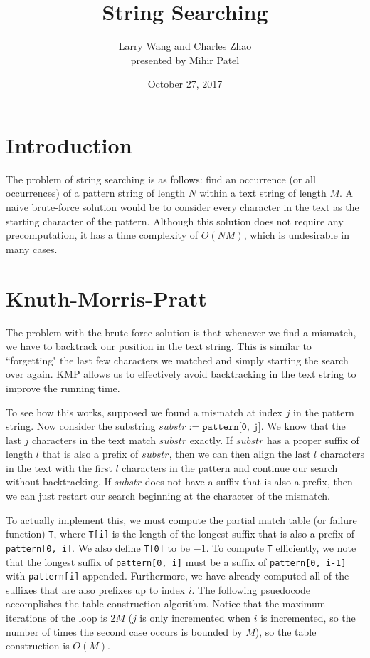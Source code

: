 \documentclass[11pt]{article}
\title{String Searching}
\author{Larry Wang and Charles Zhao \\
    \normalsize presented by Mihir Patel}
\date{October 27, 2017}
\begin{document}
\maketitle

\section{Introduction}
The problem of string searching is as follows: find an occurrence (or all occurrences) of a pattern string of length $N$ within a text string of length $M$. A naive brute-force solution would be to consider every character in the text as the starting character of the pattern. Although this solution does not require any precomputation, it has a time complexity of $O(NM)$, which is undesirable in many cases. 


\section{Knuth-Morris-Pratt}
The problem with the brute-force solution is that whenever we find a mismatch, we have to backtrack our position in the text string. This is similar to ``forgetting" the last few characters we matched and simply starting the search over again. KMP allows us to effectively avoid backtracking in the text string to improve the running time. 

To see how this works, supposed we found a mismatch at index $j$ in the pattern string. Now consider the substring $substr := \texttt{pattern[0, j]}$. We know that the last $j$ characters in the text match $substr$ exactly. If $substr$ has a proper suffix of length $l$ that is also a prefix of $substr$, then we can then align the last $l$ characters in the text with the first $l$ characters in the pattern and continue our search without backtracking. If $substr$ does not have a suffix that is also a prefix, then we can just restart our search beginning at the character of the mismatch. 

To actually implement this, we must compute the partial match table (or failure function) \texttt{T}, where \texttt{T[i]} is the length of the longest suffix that is also a prefix of \texttt{pattern[0, i]}. We also define \texttt{T[0]} to be $-1$. To compute \texttt{T} efficiently, we note that the longest suffix of \texttt{pattern[0, i]} must be a suffix of \texttt{pattern[0, i-1]} with \texttt{pattern[i]} appended. Furthermore, we have already computed all of the suffixes that are also prefixes up to index $i$. The following psuedocode accomplishes the table construction algorithm. Notice that the maximum iterations of the loop is $2M$ ($j$ is only incremented when $i$ is incremented, so the number of times the second case occurs is bounded by $M$), so the table construction is $O(M)$. 
\end{document}
